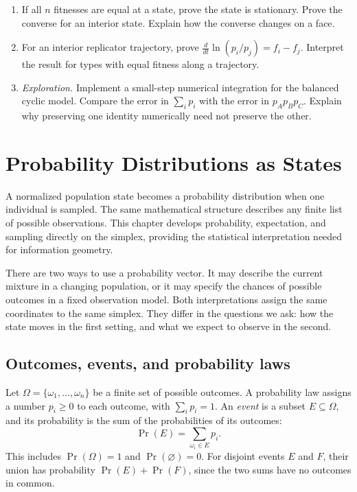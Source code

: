 \documentclass[11pt,oneside,openany]{book}
\theoremstyle{definition}
\theoremstyle{remark}
\newenvironment{exercises}{\begin{enumerate}[label=\thechapter.\arabic*,ref=\thechapter.\arabic*,leftmargin=2.8em,itemsep=6pt]}{\end{enumerate}}
\numberwithin{equation}{chapter}
\begin{document}
\begin{exercises}
\item If all $n$ fitnesses are equal at a state, prove the state is stationary. Prove the converse for an interior state. Explain how the converse changes on a face.
\item For an interior replicator trajectory, prove $\frac{d}{dt}\ln(p_i/p_j)=f_i-f_j$. Interpret the result for types with equal fitness along a trajectory.
\item \emph{Exploration.} Implement a small-step numerical integration for the balanced cyclic model. Compare the error in $\sum_i p_i$ with the error in $p_Ap_Bp_C$. Explain why preserving one identity numerically need not preserve the other.
\end{exercises}

\chapter{Probability Distributions as States}
\label{ch:probability}

A normalized population state becomes a probability distribution when one individual is sampled. The same mathematical structure describes any finite list of possible observations. This chapter develops probability, expectation, and sampling directly on the simplex, providing the statistical interpretation needed for information geometry.

There are two ways to use a probability vector. It may describe the current mixture in a changing population, or it may specify the chances of possible outcomes in a fixed observation model. Both interpretations assign the same coordinates to the same simplex. They differ in the questions we ask: how the state moves in the first setting, and what we expect to observe in the second.

\section{Outcomes, events, and probability laws}
Let $\Omega=\{\omega_1,\ldots,\omega_n\}$ be a finite set of possible outcomes. A probability law assigns a number $p_i\geq0$ to each outcome, with $\sum_i p_i=1$. An \emph{event} is a subset $E\subseteq\Omega$, and its probability is the sum of the probabilities of its outcomes:
\[
\Pr(E)=\sum_{\omega_i\in E}p_i.
\]
This includes $\Pr(\Omega)=1$ and $\Pr(\varnothing)=0$. For disjoint events $E$ and $F$, their union has probability $\Pr(E)+\Pr(F)$, since the two sums have no outcomes in common.
\end{document}
